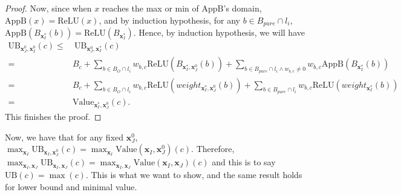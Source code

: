 \documentclass[]{article}
\theoremstyle{definition}
\newcommand{\ReLU}{\mathrm{ReLU}}
\newcommand{\Val}{\mathrm{Value}}
\newcommand{\UB}{\mathrm{UB}}
\begin{document}
\begin{proof}
Now, since when $x$ reaches the max or min of $\mathrm{AppB}$'s domain, $\mathrm{AppB}(x)=\ReLU(x)$, and by induction hypothesis, for any $b\in B_{pure}\cap l_i$, $\mathrm{AppB}(B_{\boldsymbol{x}^*_I}(b))=\ReLU(B_{\boldsymbol{x}^*_I})$. Hence, by induction hypothesis, we will have \begin{align*}
	\mathrm{UB}_{\boldsymbol{x}^0_J,\boldsymbol{x}^0_I}(c)\leq & \ \mathrm{UB}_{\boldsymbol{x}^0_J,\boldsymbol{x}^*_I}(c) \\
	= &B_c + \sum_{b\in B_O\cap l_i} w_{b,c}\ReLU(B_{\boldsymbol{x}^*_I,\boldsymbol{x}^0_J}(b)) + \sum_{b\in B_{pure}\cap l_{i}\wedge w_{b,c}\neq 0} w_{b,c} \mathrm{AppB}(B_{\boldsymbol{x}^*_I}(b))\\
	= &B_c + \sum_{b\in B_O\cap l_i} w_{b,c}\ReLU(weight_{\boldsymbol{x}^*_I,\boldsymbol{x}^0_J}(b)) + \sum_{b\in B_{pure}\cap l_{i}} w_{b,c} \mathrm{ReLU}(weight_{\boldsymbol{x}^*_I}(b))\\
	= & \Val_{\boldsymbol{x}^*_I,\boldsymbol{x}^0_J}(c).
\end{align*} This finishes the proof.
	\end{proof}


Now, we have that for any fixed $\boldsymbol{x}^0_J$, $\max_{\boldsymbol{x}_I} \UB_{\boldsymbol{x}_I,\boldsymbol{x}^0_J}(c)= \max_{\boldsymbol{x}_I} \Val(\boldsymbol{x}_I,\boldsymbol{x}^0_J)(c)$. Therefore, $\max_{\boldsymbol{x}_I,\boldsymbol{x}_J} \UB_{\boldsymbol{x}_I,\boldsymbol{x}_J}(c)= \max_{\boldsymbol{x}_I,\boldsymbol{x}_J} \Val(\boldsymbol{x}_I,\boldsymbol{x}_J)(c)$ and this is to say $\UB(c)=\max(c)$. This is what we want to show, and the same result holds for lower bound and minimal value.
\end{document}
